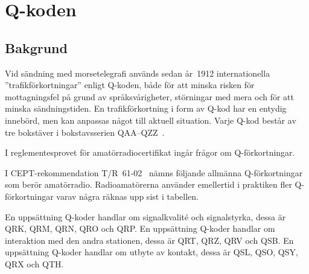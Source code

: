 \section{Q-koden}
\label{q-koden}

\subsection{Bakgrund}

Vid sändning med morsetelegrafi används sedan år~1912 internationella
''trafikförkortningar'' enligt Q-koden, både för att minska risken för
mottagningsfel på grund av språksvårigheter, störningar med mera och för
att minska sändningstiden.
En trafikförkortning i form av Q-kod har en entydig innebörd, men kan anpassas
något till aktuell situation.
Varje Q-kod består av tre bokstäver i bokstavsserien
QAA--QZZ~\cite[M.1172]{ITU-RR}.

I reglementesprovet för amatörradiocertifikat ingår frågor om Q-förkortningar.

I CEPT-rekommendation T/R~61-02~\cite[Annex 6]{TR6102} nämns följande allmänna
Q-förkortningar som berör amatörradio.
Radioamatörerna använder emellertid i praktiken fler Q-förkortningar varav
några räknas upp sist i tabellen.

En uppsättning Q-koder handlar om signalkvalité och signalstyrka, dessa är
QRK, QRM, QRN, QRO och QRP.
En uppsättning Q-koder handlar om interaktion med den andra stationen,
dessa är QRT, QRZ, QRV och QSB.
En uppsättning Q-koder handlar om utbyte av kontakt, dessa är QSL, QSO,
QSY, QRX och QTH.

